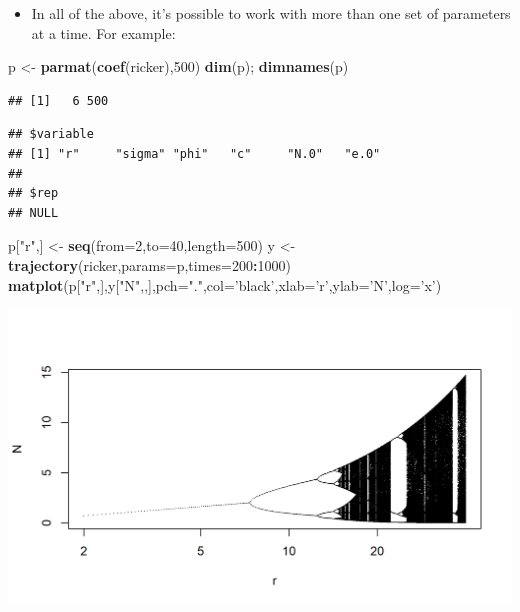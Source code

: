 \documentclass[]{article}
\newenvironment{Shaded}{\begin{snugshade}}{\end{snugshade}}
\newcommand{\KeywordTok}[1]{\textcolor[rgb]{0.13,0.29,0.53}{\textbf{#1}}}
\newcommand{\DataTypeTok}[1]{\textcolor[rgb]{0.13,0.29,0.53}{#1}}
\newcommand{\DecValTok}[1]{\textcolor[rgb]{0.00,0.00,0.81}{#1}}
\newcommand{\StringTok}[1]{\textcolor[rgb]{0.31,0.60,0.02}{#1}}
\newcommand{\OperatorTok}[1]{\textcolor[rgb]{0.81,0.36,0.00}{\textbf{#1}}}
\newcommand{\NormalTok}[1]{#1}
\providecommand{\tightlist}{%
  \setlength{\itemsep}{0pt}\setlength{\parskip}{0pt}}
\begin{document}
\begin{itemize}
\tightlist
\item
  In all of the above, it's possible to work with more than one set of
  parameters at a time. For example:
\end{itemize}

\begin{Shaded}
\begin{Highlighting}[]
\NormalTok{p <-}\StringTok{ }\KeywordTok{parmat}\NormalTok{(}\KeywordTok{coef}\NormalTok{(ricker),}\DecValTok{500}\NormalTok{)}
\KeywordTok{dim}\NormalTok{(p); }\KeywordTok{dimnames}\NormalTok{(p)}
\end{Highlighting}
\end{Shaded}

\begin{verbatim}
## [1]   6 500
\end{verbatim}

\begin{verbatim}
## $variable
## [1] "r"     "sigma" "phi"   "c"     "N.0"   "e.0"  
## 
## $rep
## NULL
\end{verbatim}

\begin{Shaded}
\begin{Highlighting}[]
\NormalTok{p[}\StringTok{"r"}\NormalTok{,] <-}\StringTok{ }\KeywordTok{seq}\NormalTok{(}\DataTypeTok{from=}\DecValTok{2}\NormalTok{,}\DataTypeTok{to=}\DecValTok{40}\NormalTok{,}\DataTypeTok{length=}\DecValTok{500}\NormalTok{)}
\NormalTok{y <-}\StringTok{ }\KeywordTok{trajectory}\NormalTok{(ricker,}\DataTypeTok{params=}\NormalTok{p,}\DataTypeTok{times=}\DecValTok{200}\OperatorTok{:}\DecValTok{1000}\NormalTok{)}
\KeywordTok{matplot}\NormalTok{(p[}\StringTok{"r"}\NormalTok{,],y[}\StringTok{"N"}\NormalTok{,,],}\DataTypeTok{pch=}\StringTok{"."}\NormalTok{,}\DataTypeTok{col=}\StringTok{'black'}\NormalTok{,}\DataTypeTok{xlab=}\StringTok{'r'}\NormalTok{,}\DataTypeTok{ylab=}\StringTok{'N'}\NormalTok{,}\DataTypeTok{log=}\StringTok{'x'}\NormalTok{)}
\end{Highlighting}
\end{Shaded}

\begin{center}\includegraphics{figure/intro-bifdiag-1} \end{center}
\end{document}
